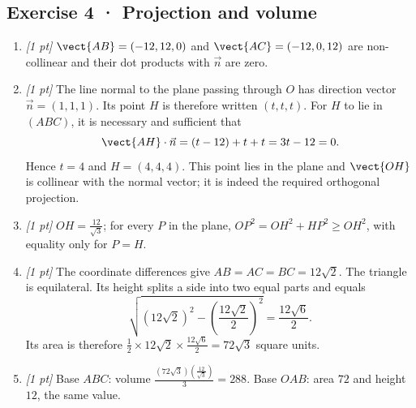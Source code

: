 \subsection*{Exercise 4 · Projection and volume}\begin{enumerate}

\item \textit{[1 pt]} $\vect{AB}=(-12,12,0)$ and $\vect{AC}=(-12,0,12)$ are non-collinear and their dot products with $\vec n$ are zero.

\item \textit{[1 pt]} The line normal to the plane passing through $O$ has direction vector $\vec n=(1,1,1)$. Its point $H$ is therefore written $(t,t,t)$. For $H$ to lie in $(ABC)$, it is necessary and sufficient that
\[\vect{AH}\cdot\vec n=(t-12)+t+t=3t-12=0.\]
Hence $t=4$ and $H=(4,4,4)$. This point lies in the plane and $\vect{OH}$ is collinear with the normal vector; it is indeed the required orthogonal projection.

\item \textit{[1 pt]} $OH=\frac{12}{\sqrt{3}}$; for every $P$ in the plane, $OP^2=OH^2+HP^2\ge OH^2$, with equality only for $P=H$.

\item \textit{[1 pt]} The coordinate differences give $AB=AC=BC=12\sqrt2$. The triangle is equilateral. Its height splits a side into two equal parts and equals
\[\sqrt{(12\sqrt2)^2-(\frac{12\sqrt{2}}{2})^2}=\frac{12\sqrt6}{2}.\]
Its area is therefore $\frac12\times 12\sqrt2\times\frac{12\sqrt6}{2}=72\sqrt3$ square units.

\item \textit{[1 pt]} Base $ABC$: volume $\frac{(72\sqrt3)(\frac{12}{\sqrt{3}})}{3}=288$. Base $OAB$: area $72$ and height $12$, the same value.

\end{enumerate}

\fi

\fi

